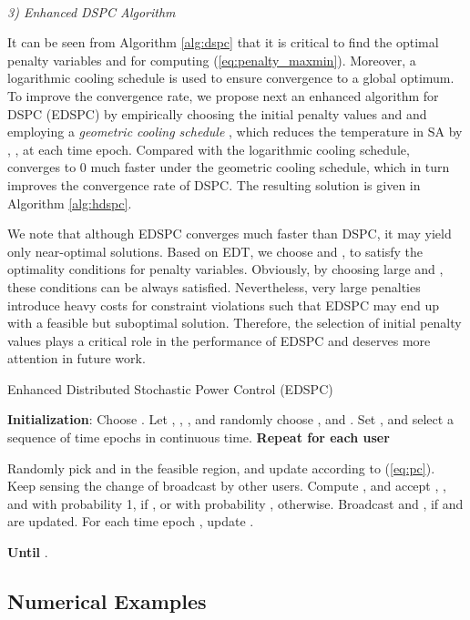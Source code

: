 \documentclass[10pt,journal,letterpaper,compsoc]{IEEEtran}
\begin{document}
{{\noindent
\\
\emph{3) Enhanced DSPC Algorithm}

It can be seen from Algorithm \ref{alg:dspc} that it is critical to find the optimal penalty variables  and  for computing (\ref{eq:penalty_maxmin}). Moreover, a logarithmic cooling schedule is used to ensure convergence to a global optimum. To improve the convergence rate, we propose next an enhanced algorithm for DSPC (EDSPC) by empirically choosing the initial penalty values  and  and employing a \emph{geometric cooling schedule} \cite{Kirkpatrick:1983}, which reduces the temperature  in SA by , , at each time epoch. Compared with the logarithmic cooling schedule,  converges to 0 much faster under the geometric cooling schedule, which in turn improves the convergence rate of DSPC. The resulting solution is given in Algorithm \ref{alg:hdspc}.

We note that although EDSPC converges much faster than DSPC, it may yield only near-optimal solutions. Based on EDT, we  choose  and , to satisfy the optimality conditions for penalty variables. Obviously, by choosing large  and , these conditions can be always satisfied. Nevertheless, very large penalties introduce heavy costs for constraint violations such that EDSPC may end up with a feasible but suboptimal solution. Therefore, the selection of initial penalty values plays a critical role in  the performance of EDSPC and deserves more attention in future work.



\begin{algorithm}
\caption{Enhanced Distributed Stochastic Power Control (EDSPC)}
\label{alg:hdspc}
\begin{algorithmic}
\STATE \textbf{Initialization}: Choose . Let , , , and randomly choose ,  and .
\STATE Set , and select a sequence of time epochs  in continuous time.
\STATE \textbf{Repeat for each user} 
\begin{enumerate}
\STATE Randomly pick  and  in the feasible region, and update  according to (\ref{eq:pc}).
\STATE Keep sensing the change of  broadcast by other users.
\STATE Compute , and accept , , and  with probability 1, if , or with probability , otherwise.
\STATE Broadcast  and , if  and  are updated.
\STATE For each time epoch , update .
\end{enumerate}
\STATE \textbf{Until} .
\end{algorithmic}
\end{algorithm}

\subsection{Numerical Examples}\label{sec:unicastnumerical}

}}
\end{document}
